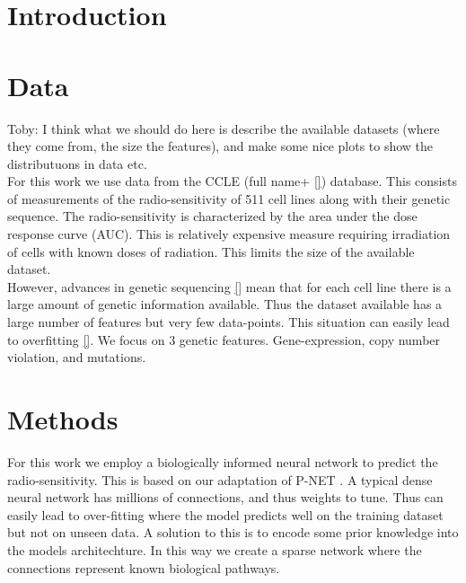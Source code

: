 \documentclass[NOTE, disdraft=true, UKenglish]{\DISCDTLATEXPATH UCLCDTDISdoc}
\begin{document}
\maketitle

\tableofcontents

\clearpage


\newpage

\newpage
\section{Introduction}
\label{sec:introduction}
%
\section{Data}
\label{sec:data}
{\color{red}Toby: I think what we should do here is describe the available datasets (where they come from, the size the features), and make some nice plots to show the distributuons in data etc.}
\\
For this work we use data from the CCLE (full name+ \ref{}) database. This consists of measurements of the radio-sensitivity of 511 cell lines along with their genetic sequence. The radio-sensitivity is characterized by the area under the dose response curve (AUC). This is relatively expensive measure requiring irradiation of cells with known doses of radiation. This limits the size of the available dataset. 
\\ \indent However, advances in genetic sequencing \ref{} mean that for each cell line there is a large amount of genetic information available. Thus the dataset available has a large number of features but very few data-points. This situation can easily lead to overfitting \ref{}. We focus on 3 genetic features. Gene-expression, copy number violation, and mutations.
\section{Methods}
\label{sec:method}
For this work we employ a biologically informed neural network to predict the radio-sensitivity. This is based on our adaptation of P-NET \cite{mythesis}. A typical dense neural network has millions of connections, and thus weights to tune. Thus can easily lead to over-fitting where the model predicts well on the training dataset but not on unseen data. A solution to this is to encode some prior knowledge into the models architechture. In this way we create a sparse network where the connections represent known biological pathways.
\end{document}
